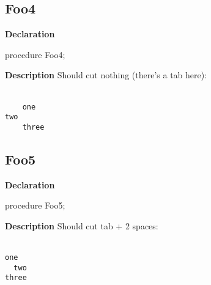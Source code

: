 \documentclass{report}
\begin{document}
\subsection*{Foo4}
\begin{list}{}{
\setlength{\itemindent}{0cm}
\setlength{\listparindent}{0cm}
\setlength{\leftmargin}{\evensidemargin}
\addtolength{\leftmargin}{\tmplength}
\settowidth{\labelsep}{X}
\addtolength{\leftmargin}{\labelsep}
\setlength{\labelwidth}{\tmplength}
}
\begin{flushleft}
\item[\textbf{Declaration}\hfill]
\begin{ttfamily}
procedure Foo4;\end{ttfamily}


\end{flushleft}
\par
\item[\textbf{Description}]
Should cut nothing (there's a tab here):

\texttt{\\\nopagebreak[3]
~~~~one\\\nopagebreak[3]
	two\\\nopagebreak[3]
~~~~three\\
}

\end{list}
\subsection*{Foo5}
\begin{list}{}{
\setlength{\itemindent}{0cm}
\setlength{\listparindent}{0cm}
\setlength{\leftmargin}{\evensidemargin}
\addtolength{\leftmargin}{\tmplength}
\settowidth{\labelsep}{X}
\addtolength{\leftmargin}{\labelsep}
\setlength{\labelwidth}{\tmplength}
}
\begin{flushleft}
\item[\textbf{Declaration}\hfill]
\begin{ttfamily}
procedure Foo5;\end{ttfamily}


\end{flushleft}
\par
\item[\textbf{Description}]
Should cut tab + 2 spaces:

\texttt{\\\nopagebreak[3]
one\\\nopagebreak[3]
~~two\\\nopagebreak[3]
three\\
}

\end{list}
\end{document}
